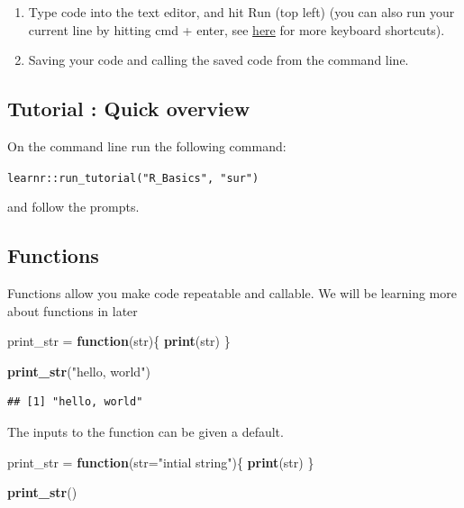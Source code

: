\documentclass[]{book}
\newenvironment{Shaded}{\begin{snugshade}}{\end{snugshade}}
\newcommand{\ControlFlowTok}[1]{\textcolor[rgb]{0.13,0.29,0.53}{\textbf{#1}}}
\newcommand{\DataTypeTok}[1]{\textcolor[rgb]{0.13,0.29,0.53}{#1}}
\newcommand{\KeywordTok}[1]{\textcolor[rgb]{0.13,0.29,0.53}{\textbf{#1}}}
\newcommand{\NormalTok}[1]{#1}
\newcommand{\StringTok}[1]{\textcolor[rgb]{0.31,0.60,0.02}{#1}}
\begin{document}
\begin{enumerate}
\def\labelenumi{\arabic{enumi}.}
\setcounter{enumi}{1}
\item
  Type code into the text editor, and hit Run (top left) (you can also run your current line by hitting cmd + enter, see \href{https://support.rstudio.com/hc/en-us/articles/200711853-Keyboard-Shortcuts}{here} for more keyboard shortcuts).
\item
  Saving your code and calling the saved code from the command line.
\end{enumerate}

\hypertarget{tutorial-quick-overview}{%
\subsection{Tutorial : Quick overview}\label{tutorial-quick-overview}}

On the command line run the following command:

\texttt{learnr::run\_tutorial("R\_Basics",\ "sur")}

and follow the prompts.

\hypertarget{functions}{%
\subsection{Functions}\label{functions}}

Functions allow you make code repeatable and callable. We will be learning more about functions in later

\begin{Shaded}
\begin{Highlighting}[]
\NormalTok{print_str =}\StringTok{ }\ControlFlowTok{function}\NormalTok{(str)\{}
\KeywordTok{print}\NormalTok{(str)}
\NormalTok{\}}

\KeywordTok{print_str}\NormalTok{(}\StringTok{"hello, world"}\NormalTok{)}
\end{Highlighting}
\end{Shaded}

\begin{verbatim}
## [1] "hello, world"
\end{verbatim}

The inputs to the function can be given a default.

\begin{Shaded}
\begin{Highlighting}[]
\NormalTok{print_str =}\StringTok{ }\ControlFlowTok{function}\NormalTok{(}\DataTypeTok{str=}\StringTok{"intial string"}\NormalTok{)\{}
\KeywordTok{print}\NormalTok{(str)}
\NormalTok{\}}

\KeywordTok{print_str}\NormalTok{()}
\end{Highlighting}
\end{Shaded}
\end{document}
